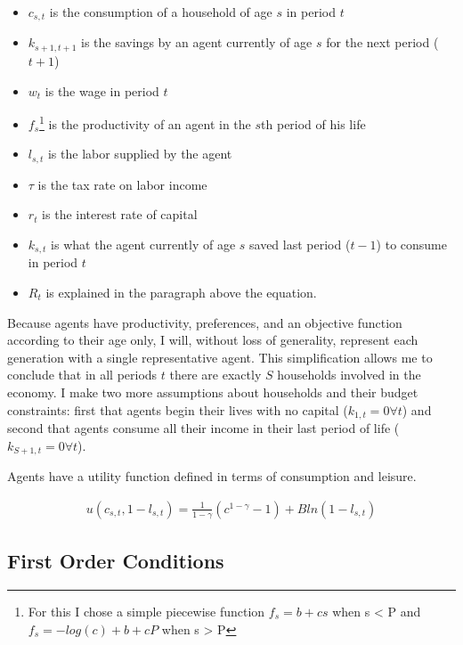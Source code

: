\documentclass[paper=a4, fontsize=11pt]{scrartcl} %
\numberwithin{figure}{section} %
\numberwithin{table}{section} %
\begin{document}
            \begin{itemize}
              \item $c_{s, t}$ is the consumption of a household of age $s$ in period $t$
              \item $k_{s+1, t+1}$ is the savings by an agent currently of age $s$ for the next period ($t + 1$)
              \item $w_t$ is the wage in period $t$
              \item $f_s$\footnote{For this I chose a simple piecewise function $f_s = b + c s$ when s < P and $f_s = - log(c) + b + c P$ when s > P} is the productivity of an agent in the $s$th period of his life
              \item $l_{s, t}$ is the labor supplied by the agent
              \item $\tau$ is the tax rate on labor income
              \item $r_t$ is the interest rate of capital
              \item $k_{s, t}$ is what the agent currently of age $s$ saved last period ($t-1$) to consume in period $t$
              \item $R_t$ is explained in the paragraph above the equation.
            \end{itemize}

		Because agents have productivity, preferences, and an objective function according to their age only, I will, without loss of generality, represent each generation with a single representative agent. This simplification allows me to conclude that in all periods $t$ there are exactly $S$ households involved in the economy. I make two more assumptions about households and their budget constraints: first that agents begin their lives with no capital ($k_{1, t} = 0 \forall t$) and second that agents consume all their income in their last period of life ($k_{S+1, t} = 0 \forall t$).

            Agents have a utility function defined in terms of consumption and leisure.

		\begin{align}
			u(c_{s, t}, 1 - l_{s, t}) = \frac{1}{1 - \gamma}(c^{1 -\gamma} - 1) + B ln(1 - l_{s,t})
		\end{align}

      \subsection{First Order Conditions}
          \label{sub:first_order_conditions}
\end{document}
